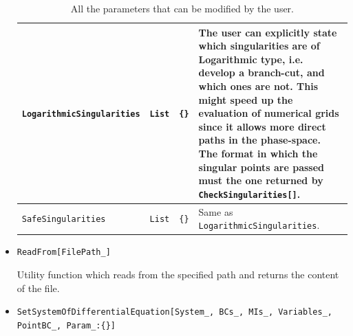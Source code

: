 \documentclass[final,1p,times]{elsarticle}
\begin{document}
\begin{itemize}
\begin{table}[t!]
{\begin{tabular}{|C{4 cm}|C{2 cm}| C{1.5 cm}|J{7 cm}|}
        \hline
        {\small\texttt{LogarithmicSingularities}} & \texttt{List} & \texttt{\{\}} & {\small The user can explicitly state which singularities are of Logarithmic type, i.e. develop a branch-cut, and which ones are not. This might speed up the evaluation of numerical grids since it allows more direct paths in the phase-space. The format in which the singular points are passed must the one returned by \texttt{CheckSingularities[]}.}\\
        \hline
        {\small\texttt{SafeSingularities}} & \texttt{List} & \texttt{\{\}} & {\small Same as \texttt{LogarithmicSingularities}.}\\
        \hline
       \end{tabular}
       }
       \caption{All the parameters that can be modified by the user.}
       \label{table:configuration}
   \end{table}
    
    \item \texttt{ReadFrom[FilePath\_]} 
    
    Utility function which reads from the specified path and returns the content of the file.
    
    \item \texttt{SetSystemOfDifferentialEquation[System\_, BCs\_, MIs\_, Variables\_, PointBC\_, Param\_:\{\}]}
    

\end{itemize}
\end{document}
